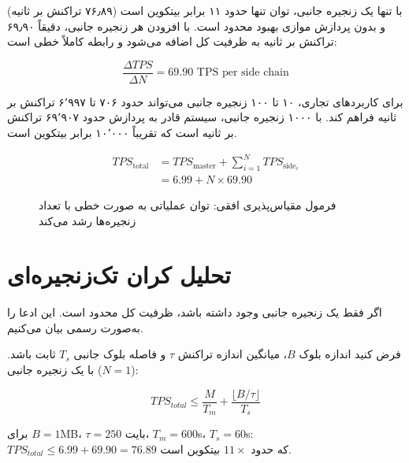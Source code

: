 با تنها یک زنجیره جانبی، توان تنها حدود ۱۱ برابر بیتکوین است (۷۶٫۸۹ تراکنش بر ثانیه) و بدون پردازش موازی بهبود محدود است. با افزودن هر زنجیره جانبی، دقیقاً ۶۹٫۹۰ تراکنش بر ثانیه به ظرفیت کل اضافه می‌شود و رابطه کاملاً خطی است:

\begin{latin}
\begin{equation}
\frac{\Delta TPS}{\Delta N} = 69.90 \text{ TPS per side chain}
\end{equation}
\end{latin}

برای کاربردهای تجاری، ۱۰ تا ۱۰۰ زنجیره جانبی می‌تواند حدود ۷۰۶ تا ۶٬۹۹۷ تراکنش بر ثانیه فراهم کند. با ۱۰۰۰ زنجیره جانبی، سیستم قادر به پردازش حدود ۶۹٬۹۰۷ تراکنش بر ثانیه است که تقریباً ۱۰٬۰۰۰ برابر بیتکوین است.

\begin{figure}[h]
\centering
\begin{latin}
\begin{equation}
\begin{split}
TPS_{\text{total}} &= TPS_{\text{master}} + \sum_{i=1}^{N} TPS_{\text{side}_{i}} \\
&= 6.99 + N \times 69.90
\end{split}
\end{equation}
\end{latin}
\caption{فرمول مقیاس‌پذیری افقی: توان عملیاتی به صورت خطی با تعداد زنجیره‌ها رشد می‌کند}
\label{fig:scaling-formula}
\end{figure}

\section{تحلیل کران تک‌زنجیره‌ای}

اگر فقط یک زنجیره جانبی وجود داشته باشد، ظرفیت کل محدود است. این ادعا را به‌صورت رسمی بیان می‌کنیم.

\begin{theorem}
\label{thm:single-chain-bound}
فرض کنید اندازه بلوک \(B\)، میانگین اندازه تراکنش \(\tau\) و فاصله بلوک جانبی \(T_s\) ثابت باشد. با یک زنجیره جانبی (\(N=1\)):
\begin{latin}
\[
TPS_{total} \leq \frac{M}{T_m} + \frac{\lfloor B/\tau \rfloor}{T_s}
\]
\end{latin}
برای \(B=1\)MB، \(\tau=250\) بایت، \(T_m=600\)s، \(T_s=60\)s: \(TPS_{total} \leq 6.99 + 69.90 = 76.89\) که حدود \(11\times\) بیتکوین است.
\end{theorem}


